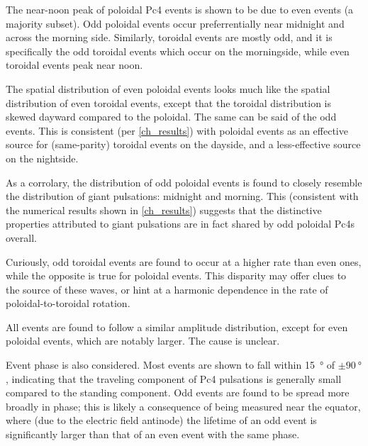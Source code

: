 The near-noon peak of poloidal Pc4 events is shown to be due to even events (a
majority subset). Odd poloidal events occur preferrentially near midnight and
across the morning side. Similarly, toroidal events are mostly odd, and it is
specifically the odd toroidal events which occur on the morningside, while even
toroidal events peak near noon. 

The spatial distribution of even poloidal events looks much like the spatial
distribution of even toroidal events, except that the toroidal distribution is
skewed dayward compared to the poloidal. The same can be said of the odd
events. This is consistent (per \cref{ch_results}) with poloidal events as an
effective source for (same-parity) toroidal events on the dayside, and a
less-effective source on the nightside. 

As a corrolary, the distribution of odd poloidal events is found to closely
resemble the distribution of giant pulsations: midnight and morning. This
(consistent with the numerical results shown in \cref{ch_results}) suggests
that the distinctive properties attributed to giant pulsations are in fact
shared by odd poloidal Pc4s overall. 

Curiously, odd toroidal events are found to occur at a higher rate than even
ones, while the opposite is true for poloidal events. This disparity may offer
clues to the source of these waves, or hint at
a harmonic dependence in the rate of poloidal-to-toroidal rotation. 

All events are found to follow a similar amplitude distribution, except for
even poloidal events, which are notably larger. The cause is unclear. 

Event phase is also considered. Most events are shown to fall
within \SI{15}{\degree} of $\pm\SI{90}{\degree}$, indicating that
the traveling component of Pc4 pulsations is generally small compared to the
standing
component. Odd events are found to be spread more broadly in phase; this is
likely a consequence of being measured near the equator, where (due to the
electric field antinode) the lifetime of an odd event is significantly larger
than that of an even event with the same phase. 


